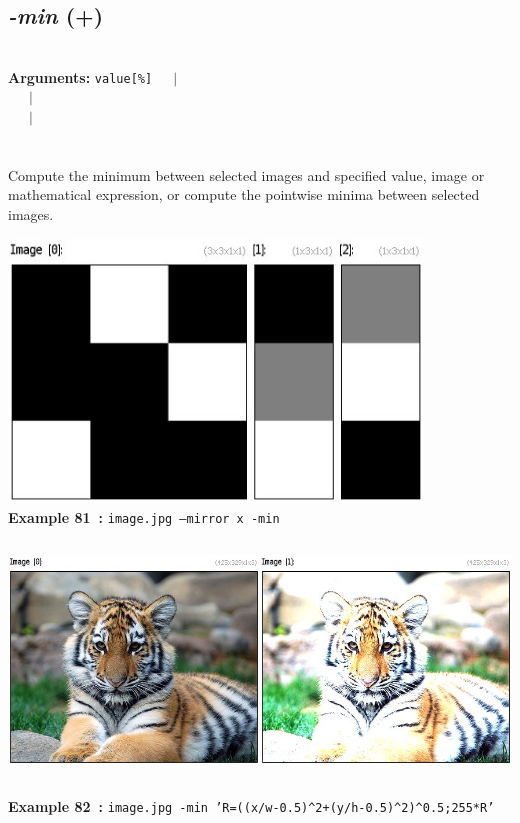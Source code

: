 \documentclass[a4paper,11pt,twoside]{book}
\begin{document}
\subsection{\emph{-min} (+)}\vspace*{-0.5em}
~\\\textbf{Arguments: } 
{\small \texttt{value[\%]}}~~~$|$\\
\hspace*{2.2cm}{\small \texttt{[image]}}~~~$|$\\
~~~$|$\\
\\~\\
Compute the minimum between selected images and specified value, image or
mathematical expression, or compute the pointwise minima between selected images.
\begin{center}\includegraphics[keepaspectratio=true,height=7cm,width=\textwidth]{img/gmic_def81.jpg}\\
{\footnotesize \textbf{Example 81~:} \texttt{image.jpg --mirror x -min}}
\\\includegraphics[keepaspectratio=true,height=7cm,width=\textwidth]{img/gmic_def82.jpg}\\
{\footnotesize \textbf{Example 82~:} \texttt{image.jpg -min 'R=((x/w-0.5)\textasciicircum 2+(y/h-0.5)\textasciicircum 2)\textasciicircum 0.5;255*R'}}
\end{center}
\end{document}
